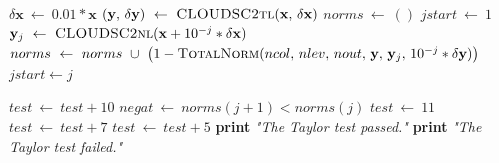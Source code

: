\documentclass[gmd,manuscript,online]{copernicus}
\theoremstyle{theorem}
\theoremstyle{definition}
\theoremstyle{remark}
\theoremstyle{proposition}
\begin{document}
\begin{algorithm}[H]
\begin{algorithmic}[1]
			\Statex

			 

			\State $\delta \mathbf{x} ~ \gets ~ 0.01 * \mathbf{x}$
			\State $\left( \mathbf{y}, \, \delta \mathbf{y} \right) ~ \gets ~ \Call{CLOUDSC2tl}{\mathbf{x}, \, \delta \mathbf{x}}$ 
			\State $norms ~ \gets ~ ()$
			\State $jstart ~ \gets ~ 1$
				\State $\mathbf{y}_j ~ \gets ~ \Call{CLOUDSC2nl}{\mathbf{x} + 10^{-j} * \delta \mathbf{x}}$
				\State $norms ~ \gets ~ norms ~ \cup ~ \left( 1 - \Call{TotalNorm}{ncol, \, nlev, \, nout, \, \mathbf{y}, \, \mathbf{y}_j, \, 10^{-j} * \delta \mathbf{y}} \right)$
					\State $jstart \gets j$
				\EndIf
			\EndFor

					\State $test ~ \gets ~ test + 10$
				\EndIf
				\State $negat ~ \gets ~ norms(j+1) < norms(j)$
			\EndFor
				\State $test ~ \gets ~ 11$
			\EndIf
				\State $test ~ \gets ~ test + 7$
			\EndIf
				\State $test ~ \gets ~ test + 5$
			\EndIf
				\State \textbf{print} \emph{"The Taylor test passed."}
			\Else
				\State \textbf{print} \emph{"The Taylor test failed."}
			\EndIf
			\EndProcedure
		\end{algorithmic}
	\end{algorithm}
\end{document}
